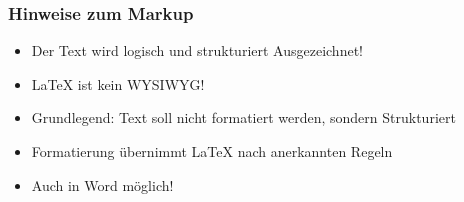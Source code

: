 \begin{frame}
  \frametitle{Hinweise zum Markup}
  \begin{itemize}
    \item Der Text wird logisch und strukturiert Ausgezeichnet!\pause
    \item \LaTeX{} ist kein WYSIWYG!\pause
    \item Grundlegend: Text soll nicht formatiert werden, sondern Strukturiert\pause
    \item Formatierung übernimmt \LaTeX{} nach anerkannten Regeln\pause
    \item Auch in Word möglich!
  \end{itemize}
\end{frame}

